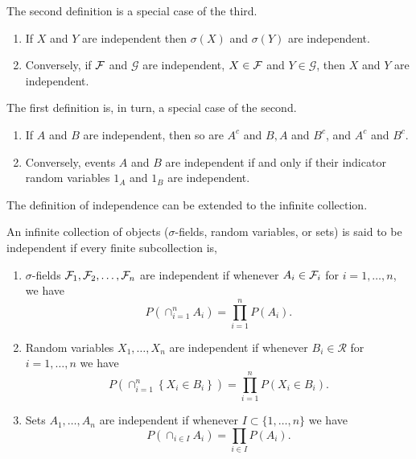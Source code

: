 The second definition is a special case of the third.

\begin{theorem}
	\begin{enumerate}
		\item If $X$ and $Y$ are independent then $\sigma(X)$ and $\sigma(Y)$ are independent.
		\item Conversely, if ${\mathcal F}$ and $\mathcal{G}$ are independent, $X\in{\mathcal F}$ and $Y\in\mathcal{G}$, then $X$ and $Y$ are independent.
	\end{enumerate}
\end{theorem}

The first definition is, in turn, a special case of the second.

\begin{theorem}
	\begin{enumerate}
		\item If $A$ and $B$ are independent, then so are $A^{c}$ and $B, A$ and $B^{c}$, and $A^{c}$ and $B^{c}$.
		\item Conversely, events $A$ and $B$ are independent if and only if their indicator random variables $1_{A}$ and $1_{B}$ are independent.
	\end{enumerate}
\end{theorem}

The definition of independence can be extended to the infinite collection.

\begin{definition}
	An infinite collection of objects ($\sigma$-fields, random variables, or sets) is said to be independent if every finite subcollection is,
	\begin{enumerate}
		\item $\sigma$-fields ${\mathcal F}_{1},{\mathcal F}_{2},\ldots,{\mathcal F}_{n}$ are independent if whenever $A_{i}\in{\mathcal F}_{i}$ for $i=1, \ldots,n$, we have
		      \begin{equation}
			      P\left(\cap_{i=1}^{n}A_{i}\right)=\prod_{i=1}^{n}P\left(A_{i}\right).
		      \end{equation}
		\item Random variables $X_{1},\ldots,X_{n}$ are independent if whenever $B_{i}\in\mathcal{R}$ for $i=1,\ldots,n$ we have
		      \begin{equation}
			      P\left(\cap_{i=1}^{n}\left\{X_{i}\in B_{i}\right\}\right)=\prod_{i=1}^{n}P\left(X_{i}\in B_{i}\right).
		      \end{equation}
		\item Sets $A_{1},\ldots,A_{n}$ are independent if whenever $I\subset\{1,\ldots,n\}$ we have
		      \begin{equation}
			      P\left(\cap_{i\in I}A_{i}\right)=\prod_{i\in I}P\left(A_{i}\right).
		      \end{equation}
	\end{enumerate}
\end{definition}

